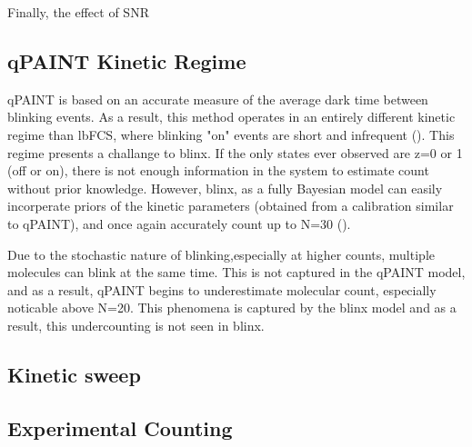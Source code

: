Finally, the effect of SNR

\subsection{qPAINT Kinetic Regime}
qPAINT is based on an accurate measure of the average dark time between blinking events. 
	As a result, this method operates in an entirely different kinetic regime than lbFCS, where blinking 
	"on" events are short and infrequent ().
	This regime presents a challange to blinx. If the only states ever observed are z=0 or 1 (off or on),
	there is not enough information in the system to estimate count without prior knowledge.
	However, blinx, as a fully Bayesian model can easily incorperate priors of the kinetic parameters
	(obtained from a calibration similar to qPAINT), and once again accurately count up to N=30 (\figref{}).

Due to the stochastic nature of blinking,especially at higher counts, multiple molecules can blink at the same time.
	This is not captured in the qPAINT model, and as a result, qPAINT begins to underestimate molecular count,
	especially noticable above N=20. This phenomena is captured by the blinx model and as a result, this undercounting
	is not seen in blinx.

\subsection{Kinetic sweep}


\subsection{Experimental Counting}
